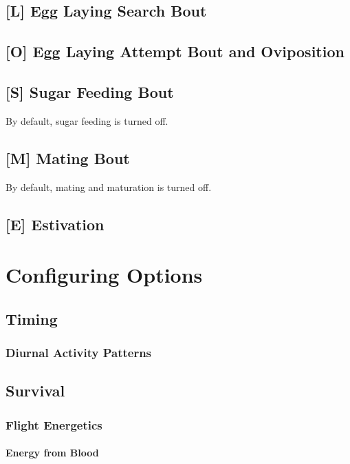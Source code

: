 \documentclass{article}
\begin{document}
\subsection*{[L] Egg Laying Search Bout}

\subsection*{[O] Egg Laying Attempt Bout and Oviposition}

\subsection*{[S] Sugar Feeding Bout}

By default, sugar feeding is turned off. 

\subsection*{[M] Mating Bout}

By default, mating and maturation is turned off. 

\subsection*{[E] Estivation}

\section{Configuring Options}

\subsection{Timing}

\subsubsection{Diurnal Activity Patterns}

\subsection{Survival}

\subsubsection{Flight Energetics}

\paragraph{Energy from Blood}
\end{document}
